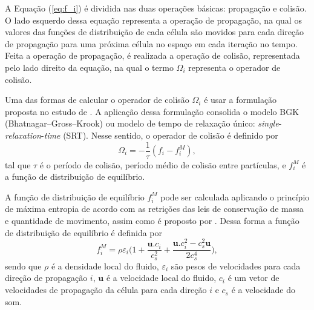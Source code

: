 A Equação (\ref{eq:f_i}) é dividida nas duas operações básicas: propagação e colisão. O lado esquerdo dessa equação representa a operação de propagação, na qual os valores das funções de distribuição de cada célula são movidos para cada direção de propagação para uma próxima célula no espaço em cada iteração no tempo. Feita a operação de propagação, é realizada a operação de colisão, representada pelo lado direito da equação, na qual o termo $\Omega_{i}$ representa o operador de colisão.

Uma das formas de calcular o operador de colisão $\Omega_{i}$ é usar a formulação proposta no estudo de . A aplicação dessa formulação consolida o modelo BGK (Bhatnagar–Gross–Krook) ou modelo de tempo de relaxação único: \textit{single}-\textit{relaxation}-\textit{time} (SRT). Nesse sentido, o operador de colisão é definido por
\begin{equation}
	\Omega_{i} = -\frac{1}{\tau}(f_{i} - f_{i}^{M}),
    \label{eq:omega_i}
\end{equation}
tal que $\tau$ é o período de colisão, período médio de colisão entre partículas, e $f_{i}^{M}$ é a função de distribuição de equilíbrio.

A função de distribuição de equilíbrio $f_{i}^{M}$ pode ser calculada aplicando o princípio de máxima entropia de acordo com as retrições das leis de conservação de massa e quantidade de movimento, assim como é proposto por . Dessa forma a função de distribuição de equilíbrio é definida por
\begin{equation}
	f_{i}^{M} = \rho \varepsilon _{i}\bigg( 1 + \frac{\textbf{u}.c_{i}}{c_{s}^{2}} + \frac{\textbf{u}.c_{i}^{2} - c_{s}^{2}\textbf{u}}{2c_{s}^{4}}\bigg),
    \label{eq:f_i_M}
\end{equation}
sendo que $\rho$ é a densidade local do fluido, $\varepsilon_{i}$ são pesos de velocidades para cada direção de propagação $i$, $\textbf{u}$ é a velocidade local do fluido, $c_{i}$ é um vetor de velocidades de propagação da célula para cada direção $i$ e $c_{s}$ é a velocidade do som.

